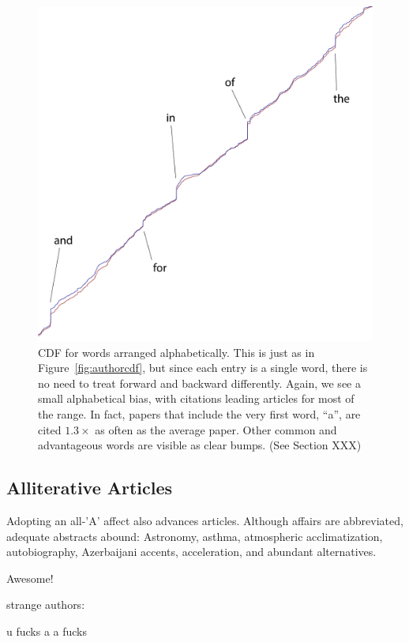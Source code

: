 \documentclass[twocolumn]{article}
\begin{document}
\begin{figure}
  \begin{center}
  \includegraphics[width=0.475 \textwidth]{wordstats}
  \end{center}
  \caption{ CDF for words arranged alphabetically. This is just as
    in Figure~\ref{fig:authorcdf}, but since each entry is a single
    word, there is no need to treat forward and backward differently.
    Again, we see a small alphabetical bias, with citations leading
    articles for most of the range. In fact, papers that include the
    very first word, ``a'', are cited $1.3\times$ as often as the
    average paper. Other common and advantageous words are visible
    as clear bumps. (See Section XXX)
  } \label{fig:wordcdf}
\end{figure}



\subsection{Alliterative Articles}

Adopting an all-'A' affect also advances articles. Although affairs
are abbreviated, adequate abstracts abound: Astronomy, asthma,
atmospheric acclimatization, autobiography, Azerbaijani accents,
acceleration, and abundant alternatives.


Awesome!

strange authors:

u fucks
a a fucks




\end{document}
